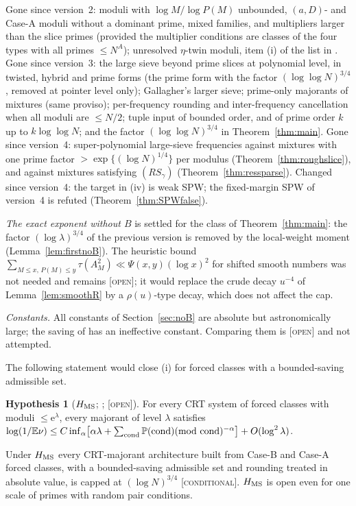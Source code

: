 \documentclass[10pt,reqno]{amsart}
\theoremstyle{definition}
\newtheorem{hypothesis}[theorem]{Hypothesis}
\theoremstyle{remark}
\newcommand{\E}{\mathbb E}
\newcommand{\Prob}{\mathbb P}
\newcommand{\e}{\mathrm e}
\newcommand{\lab}[1]{\textup{[\textsc{#1}]}}
\begin{document}
Gone since version~2: moduli with $\log M/\log P(M)$ unbounded, $(a,D)$- and
Case-A moduli without a dominant prime, mixed families, and multipliers
larger than the slice primes (provided the multiplier conditions are
classes of the four types with all primes $\leq N^A$); unresolved
$\eta$-twin moduli, item (i) of the list in \cite[\S6]{ET}.  Gone since
version~3: the large sieve beyond prime slices at polynomial level, in
twisted, hybrid and prime forms (the prime form with the factor
$(\log\log N)^{3/4}$, removed at pointer level only); Gallagher's larger
sieve; prime-only majorants of mixtures (same proviso); per-frequency rounding and inter-frequency
cancellation when all moduli are $\leq N/2$; tuple input of bounded order,
and of prime order $k$ up to $k\log\log N$; and the factor $(\log\log N)^{3/4}$
in Theorem~\ref{thm:main}.  Gone since version~4: super-polynomial
large-sieve frequencies against mixtures with one prime factor
$>\exp\{(\log N)^{1/4}\}$ per modulus (Theorem~\ref{thm:roughslice}), and against
mixtures satisfying $(RS_\gamma)$ (Theorem~\ref{thm:ressparse}).  Changed since
version~4: the target in (iv) is weak SPW; the fixed-margin SPW of
version~4 is refuted (Theorem~\ref{thm:SPWfalse}).

\emph{The exact exponent without $B$} is settled for the class of
Theorem~\ref{thm:main}: the factor $(\log\lambda)^{3/4}$ of the previous version
is removed by the local-weight moment (Lemma~\ref{lem:firstnoB}).  The
heuristic bound $\sum_{M\leq x,\,P(M)\leq y}\tau(A_M^2)\ll\Psi(x,y)(\log x)^2$ for
shifted smooth numbers \cite[Remark~3.8]{KA2} was not needed and remains
\lab{open}; it would replace the crude decay $u^{-4}$ of
Lemma~\ref{lem:smoothR} by a $\rho(u)$-type decay, which does not affect the
cap.

\emph{Constants.}  All constants of Section~\ref{sec:noB} are absolute but
astronomically large; the saving of \cite{TQ} has an ineffective constant.
Comparing them is \lab{open} and not attempted.

The following statement would close (i) for forced classes with a
bounded-saving admissible set.

\begin{hypothesis}[$H_{\rm MS}$; {\cite[\S5.6]{ET}}; \lab{open}]\label{hyp:MS}
For every CRT system of forced classes with moduli $\leq\e^\lambda$, every
majorant of level $\lambda$ satisfies
$\log(1/\E\nu)\leq C\inf_\alpha\bigl[\alpha\lambda+\sum_{\rm cond}\Prob({\rm cond})({\rm mod\ cond})^{-\alpha}\bigr]+O(\log^2\lambda)$.
\end{hypothesis}
Under $H_{\rm MS}$ every CRT-majorant architecture built from Case-B and
Case-A forced classes, with a bounded-saving admissible set and rounding
treated in absolute value, is capped at $(\log N)^{3/4}$
\lab{conditional}.  $H_{\rm MS}$ is open even for one scale of primes with
random pair conditions.
\end{document}
